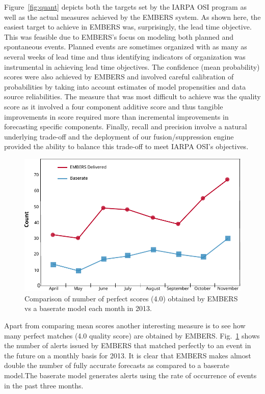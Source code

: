Figure~\ref{fig:quant} depicts both the targets set by the IARPA OSI program as well as the
actual measures achieved by the EMBERS system. As shown here, the easiest target to achieve
in EMBERS was, surprisingly, the lead time objective. This was feasible due to EMBERS's focus on modeling
both planned and spontaneous events. Planned events are sometimes organized with as many as several weeks
of lead time and thus identifying indicators of organization was instrumental in achieving
lead time objectives. The confidence (mean probability) scores were also achieved by EMBERS and involved
careful calibration of probabilities by taking into account estimates of
model propensities and data source reliabilities. The measure that was most difficult to achieve
was the quality score as it involved a four component additive score and thus tangible improvements in
score required more than incremental improvements in forecasting specific components. Finally, recall
and precision involve a natural underlying trade-off and the deployment of our fusion/suppression
engine provided the ability to balance this trade-off to meet IARPA OSI's objectives.
\begin{figure}
  \centering
\includegraphics[width=0.9\columnwidth]{figures/cu/perf_figures.pdf}
\caption{Comparison of number of perfect scores (4.0) obtained by EMBERS vs
a baserate model each month in 2013.}
\label{fig:perfect_score}
\end{figure}
Apart from comparing mean scores another interesting measure is to see
how many perfect matches (4.0 quality score) are obtained by EMBERS.
Fig.~\ref{fig:perfect_score} shows the number of alerts issued
by EMBERS that matched perfectly to an event in the future on a monthly
basis for 2013.  It is clear that EMBERS makes almost double
the number of fully accurate forecasts as compared to a baserate
model.The baserate model generates alerts using the rate
of occurrence of events in the past three months.
\vspace{-.5em}
